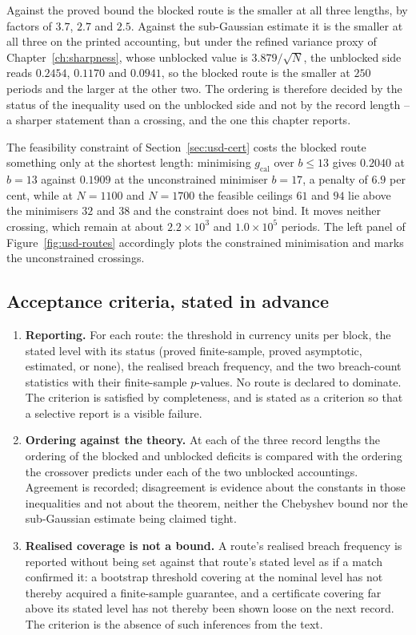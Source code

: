\documentclass[../../../main.tex]{subfiles}
\begin{document}
Against the proved bound the blocked route is the smaller at all three lengths, by factors of $3.7$, $2.7$ and $2.5$. Against the sub-Gaussian estimate it is the smaller at all three on the printed accounting, but under the refined variance proxy of Chapter~\ref{ch:sharpness}, whose unblocked value is $3.879/\sqrt N$, the unblocked side reads $0.2454$, $0.1170$ and $0.0941$, so the blocked route is the smaller at $250$ periods and the larger at the other two. The ordering is therefore decided by the status of the inequality used on the unblocked side and not by the record length -- a sharper statement than a crossing, and the one this chapter reports.

The feasibility constraint of Section~\ref{sec:usd-cert} costs the blocked route something only at the shortest length: minimising $g_{\mathrm{cal}}$ over $b\le13$ gives $0.2040$ at $b=13$ against $0.1909$ at the unconstrained minimiser $b=17$, a penalty of $6.9$ per cent, while at $N=1100$ and $N=1700$ the feasible ceilings $61$ and $94$ lie above the minimisers $32$ and $38$ and the constraint does not bind. It moves neither crossing, which remain at about $2.2\times10^3$ and $1.0\times10^5$ periods. The left panel of Figure~\ref{fig:usd-routes} accordingly plots the constrained minimisation and marks the unconstrained crossings.

\subsection{Acceptance criteria, stated in advance}

\begin{enumerate}[label=\textbf{R\arabic*.},leftmargin=2.2\parindent]
\item \textbf{Reporting.} For each route: the threshold in currency units per block, the stated level with its status (proved finite-sample, proved asymptotic, estimated, or none), the realised breach frequency, and the two breach-count statistics with their finite-sample $p$-values. No route is declared to dominate. The criterion is satisfied by completeness, and is stated as a criterion so that a selective report is a visible failure.
\item \textbf{Ordering against the theory.} At each of the three record lengths the ordering of the blocked and unblocked deficits is compared with the ordering the crossover predicts under each of the two unblocked accountings. Agreement is recorded; disagreement is evidence about the constants in those inequalities and not about the theorem, neither the Chebyshev bound nor the sub-Gaussian estimate being claimed tight.
\item \textbf{Realised coverage is not a bound.} A route's realised breach frequency is reported without being set against that route's stated level as if a match confirmed it: a bootstrap threshold covering at the nominal level has not thereby acquired a finite-sample guarantee, and a certificate covering far above its stated level has not thereby been shown loose on the next record. The criterion is the absence of such inferences from the text.
\end{enumerate}
\end{document}
